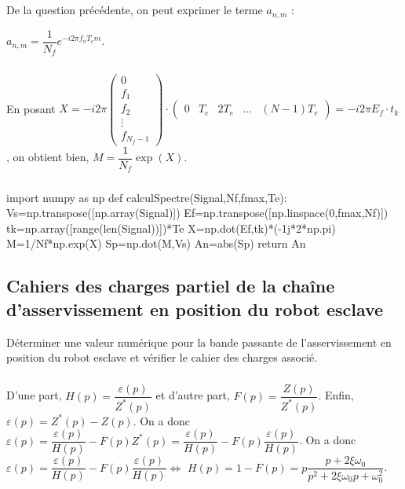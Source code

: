 \documentclass[10pt,fleqn]{article} %
\begin{document}
\subparagraph{} %
De la question précédente, on peut exprimer le terme $a_{n,m}$  : 

$a_{n,m}=\dfrac{1}{N_f}e^{-i2\pi f_{n}T_em}$.


\subparagraph{} %

En posant 
$
X=-i2\pi
\left(
\begin{array}{c}
0\\
f_1\\
f_2\\
\vdots\\
f_{N_f-1}
\end{array}
\right)
\cdot
\left(
\begin{array}{ccccc}
0& T_e & 2T_e &\ldots & (N-1)T_e
\end{array}
\right)
=-i2\pi E_f\cdot t_k
$, on obtient bien, $
M=\dfrac{1}{N_f}\exp(X)$.

\subparagraph{} %
\begin{py}
\begin{python}
import numpy as np
def calculSpectre(Signal,Nf,fmax,Te):
    Vs=np.transpose([np.array(Signal)])
    Ef=np.transpose([np.linspace(0,fmax,Nf)])
    tk=np.array([range(len(Signal))])*Te
    X=np.dot(Ef,tk)*(-1j*2*np.pi)
    M=1/Nf*np.exp(X)
    Sp=np.dot(M,Vs)
    An=abs(Sp)
    return An
\end{python}
\end{py}

\subsection{Cahiers des charges partiel de la chaîne d'asservissement en position du robot esclave}

\begin{obj}
Déterminer une valeur numérique pour la bande passante de l’asservissement en position du robot
esclave et vérifier le cahier des charges associé.
\end{obj}

\subparagraph{}	 %

D'une part, $H(p)=\dfrac{\varepsilon (p)}{Z^*(p)}$ et d'autre part, $F(p)=\dfrac{Z (p)}{Z^*(p)}$. Enfin, $\varepsilon(p)=Z^*(p)-Z(p)$. On a donc $\varepsilon(p)=\dfrac{\varepsilon(p)}{H(p)} - F(p)Z^*(p)=\dfrac{\varepsilon(p)}{H(p)} - F(p)\dfrac{\varepsilon(p)}{H(p)}$. On a donc  $\varepsilon(p)=\dfrac{\varepsilon(p)}{H(p)} - F(p)\dfrac{\varepsilon(p)}{H(p)} \Leftrightarrow $ $H(p)=1 - F(p)= p\dfrac{p+2\xi\omega_0  }{p^2+2\xi\omega_0 p + \omega_0^2}$.
\end{document}
